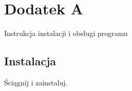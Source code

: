 \chapter{Dodatek A}
\label{cha:dodatekA}

Instrukcja instalacji i obsługi programu


\section{Instalacja}
\label{sec:instalacja}

Ściągnij i zainstaluj.

